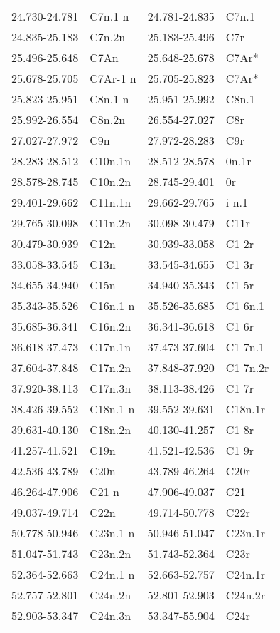 \begin{center}
\begin{longtable}{ll|ll}
24.730-24.781 & C7n.1 n & 24.781-24.835 & C7n.1\\
24.835-25.183 & C7n.2n & 25.183-25.496 & C7r\\
25.496-25.648 & C7An & 25.648-25.678 & C7Ar*\\
25.678-25.705 & C7Ar-1 n & 25.705-25.823 & C7Ar*\\
25.823-25.951 & C8n.1 n & 25.951-25.992 & C8n.1\\
25.992-26.554 & C8n.2n & 26.554-27.027 & C8r\\
27.027-27.972 & C9n & 27.972-28.283 & C9r\\
28.283-28.512 & C10n.1n & 28.512-28.578 & 0n.1r\\
28.578-28.745 &  C10n.2n & 28.745-29.401 &  0r\\
29.401-29.662 &  C11n.1n & 29.662-29.765 & i n.1\\
29.765-30.098 & C11n.2n & 30.098-30.479 & C11r\\
30.479-30.939 & C12n & 30.939-33.058 & C1 2r\\
33.058-33.545 & C13n & 33.545-34.655 & C1 3r\\
34.655-34.940 & C15n & 34.940-35.343 & C1 5r\\
35.343-35.526 & C16n.1 n & 35.526-35.685 & C1 6n.1\\
35.685-36.341 & C16n.2n & 36.341-36.618 & C1 6r\\
36.618-37.473 & C17n.1n & 37.473-37.604 & C1 7n.1\\
37.604-37.848 & C17n.2n & 37.848-37.920 & C1 7n.2r\\
37.920-38.113 & C17n.3n & 38.113-38.426 & C1 7r\\
38.426-39.552 & C18n.1 n & 39.552-39.631 & C18n.1r\\
39.631-40.130 & C18n.2n & 40.130-41.257 & C1 8r\\
41.257-41.521 & C19n & 41.521-42.536 & C1 9r\\
42.536-43.789 & C20n & 43.789-46.264 & C20r\\
46.264-47.906 & C21 n & 47.906-49.037 & C21\\
49.037-49.714 & C22n & 49.714-50.778 & C22r\\
50.778-50.946 & C23n.1 n & 50.946-51.047 & C23n.1r\\
51.047-51.743 & C23n.2n & 51.743-52.364 & C23r\\
52.364-52.663 & C24n.1 n & 52.663-52.757 & C24n.1r\\
52.757-52.801 & C24n.2n & 52.801-52.903 & C24n.2r\\
52.903-53.347 & C24n.3n & 53.347-55.904 & C24r\\

\end{longtable}
\end{center}
